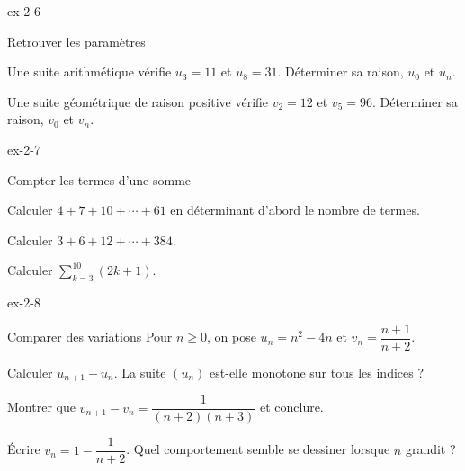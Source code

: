 \clearpage
{}
\begin{blocLivre}{ex-2-6}
\begin{exercice}[2]{Retrouver les paramètres}
\begin{questions}
\item Une suite arithmétique vérifie $u_3=11$ et $u_8=31$. Déterminer sa raison, $u_0$ et $u_n$.
\item Une suite géométrique de raison positive vérifie $v_2=12$ et $v_5=96$.
Déterminer sa raison, $v_0$ et $v_n$.
\end{questions}
\end{exercice}
\end{blocLivre}
\begin{blocLivre}{ex-2-7}
\begin{exercice}[2]{Compter les termes d'une somme}
\begin{questions}
\item Calculer $4+7+10+\cdots+61$ en déterminant d'abord le nombre de termes.
\item Calculer $3+6+12+\cdots+384$.
\item Calculer $\sum_{k=3}^{10}(2k+1)$.
\end{questions}
\end{exercice}
\end{blocLivre}
\begin{blocLivre}{ex-2-8}
\begin{exercice}[2]{Comparer des variations}
Pour $n\geq0$, on pose $u_n=n^2-4n$ et $v_n=\dfrac{n+1}{n+2}$.
\begin{questions}
\item Calculer $u_{n+1}-u_n$. La suite $(u_n)$ est-elle monotone sur tous les indices ?
\item Montrer que $v_{n+1}-v_n=\dfrac1{(n+2)(n+3)}$ et conclure.
\item Écrire $v_n=1-\dfrac1{n+2}$. Quel comportement semble se dessiner lorsque $n$ grandit ?
\end{questions}
\end{exercice}
\end{blocLivre}
